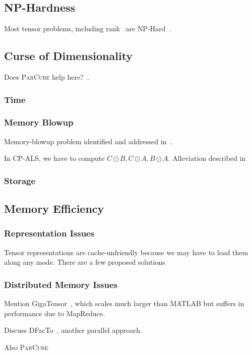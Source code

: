 \subsection{NP-Hardness}
Most tensor problems, including rank~\cite{HastadRanknp} are NP-Hard~\cite{Hillar}.

\subsection{Curse of Dimensionality}
Does \textsc{ParCube} help here?~\cite{PARCUBE}.

\subsubsection{Time}

\subsubsection{Memory Blowup}
Memory-blowup problem identified and addressed in~\cite{Kolda08scalabletensor}.

In CP-ALS, we have to compute $C\odot B, C\odot A, B\odot A$. Alleviation described in~\cite{Bader07efficientmatlab}

\subsubsection{Storage}

\subsection{Memory Efficiency}

\subsubsection{Representation Issues}
Tensor representations are cache-unfriendly because we may have to load them along any mode.
There are a few proposed solutions~\cite{6408676}

\subsubsection{Distributed Memory Issues}
Mention GigaTensor~\cite{Kang:2012}, which scales much larger than MATLAB but suffers in performance due to MapReduce. 

Discuss DFacTo~\cite{NIPS2014_5395}, another parallel approach. 

Also \textsc{ParCube}~\cite{PARCUBE}


